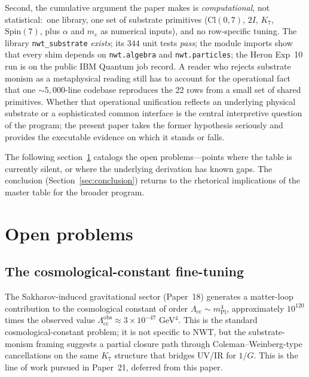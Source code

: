 \documentclass[11pt]{article}
\newcommand{\mPl}{m_{\mathrm{Pl}}}
\newcommand{\me}{m_e}
\newcommand{\nwtsub}{\texttt{nwt\_substrate}}
\begin{document}
Second, the cumulative argument the paper makes is
\emph{computational}, not statistical:\ one library, one set of
substrate primitives ($\mathrm{Cl}(0,7)$, $2I$, $K_7$,
$\mathrm{Spin}(7)$, plus $\alpha$ and $\me$ as numerical inputs),
and no row-specific tuning.  The library \nwtsub{}
\emph{exists}; its $344$ unit tests \emph{pass}; the module
imports show that every shim depends on \texttt{nwt.algebra} and
\texttt{nwt.particles}; the Heron Exp~10 run is on the public IBM
Quantum job record.  A reader who rejects substrate monism as a
metaphysical reading still has to account for the operational
fact that one $\sim 5{,}000$-line codebase reproduces the 22 rows
from a small set of shared primitives.  Whether that operational
unification reflects an underlying physical substrate or a
sophisticated common interface is the central interpretive
question of the program; the present paper takes the former
hypothesis seriously and provides the executable evidence on
which it stands or falls.

The following section~\ref{sec:open} catalogs the open
problems---points where the table is currently silent, or where
the underlying derivation has known gaps.  The conclusion
(Section~\ref{sec:conclusion}) returns to the rhetorical
implications of the master table for the broader program.

\section{Open problems}
\label{sec:open}

\subsection{The cosmological-constant fine-tuning}

The Sakharov-induced gravitational sector (Paper~18) generates a
matter-loop contribution to the cosmological constant of order
$\Lambda_{\mathrm{cc}} \sim \mPl^4$, approximately $10^{120}$
times the observed value
$\Lambda_{\mathrm{cc}}^{\mathrm{obs}} \approx 3 \times 10^{-47}$
GeV$^4$.  This is the standard cosmological-constant problem; it
is not specific to NWT, but the substrate-monism framing
suggests a partial closure path through Coleman--Weinberg-type
cancellations on the same $K_7$ structure that bridges UV/IR for
$1/G$.  This is the line of work pursued in Paper~21, deferred
from this paper.
\end{document}
